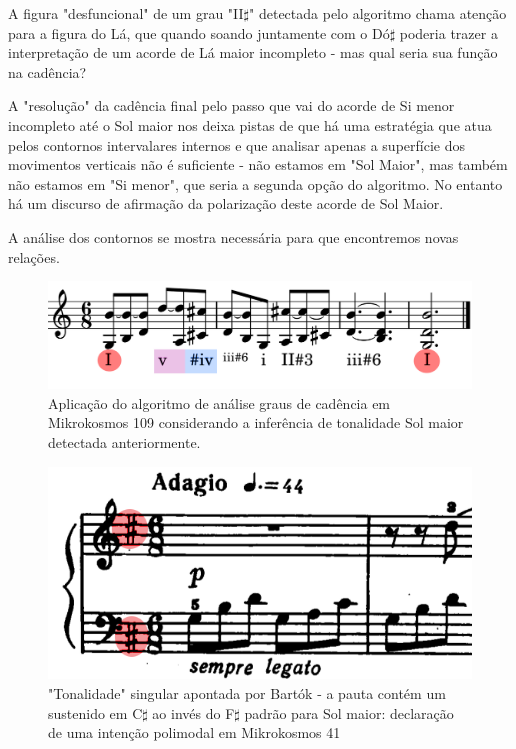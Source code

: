 \documentclass[
	12pt,				%
	openright,			%
	twoside,			%
	a4paper,			%
	english,			%
	french,				%
	spanish,			%
	brazil				%
	]{abntex2}
\begin{document}
A figura "desfuncional" de um grau "II$\sharp$" detectada pelo algoritmo chama atenção para a figura do Lá, que quando soando juntamente com o Dó$\sharp$ poderia trazer a interpretação de um acorde de Lá maior incompleto - mas qual seria sua função na cadência? 

A "resolução" da cadência final pelo passo que vai do acorde de Si menor incompleto até o Sol maior nos deixa pistas de que há uma estratégia que atua pelos contornos intervalares internos e que analisar apenas a superfície dos movimentos verticais não é suficiente - não estamos em "Sol Maior", mas também não estamos em "Si menor", que seria a segunda opção do algoritmo. No entanto há um discurso de afirmação da polarização deste acorde de Sol Maior.

A análise dos contornos se mostra necessária para que encontremos novas relações. 

\begin{figure}[!h]
	\caption{\label{fig_grafico} Aplicação do algoritmo de análise graus de cadência em Mikrokosmos 109 considerando a inferência de tonalidade Sol maior detectada anteriormente.} 
	\begin{center}
	    \includegraphics[scale=0.25]{estudosM21/mikro041FinalChords.png}
	\end{center}
\end{figure}



\begin{figure}[!h]
	\caption{\label{fig_grafico} "Tonalidade" singular apontada por Bartók - a pauta contém um sustenido em C$\sharp$ ao invés do F$\sharp$ padrão para Sol maior: declaração de uma intenção polimodal em Mikrokosmos 41} 
	\begin{center}
	    \includegraphics[scale=0.4]{estudosM21/mikro041_inicio.png}
	\end{center}
\end{figure}
\end{document}
